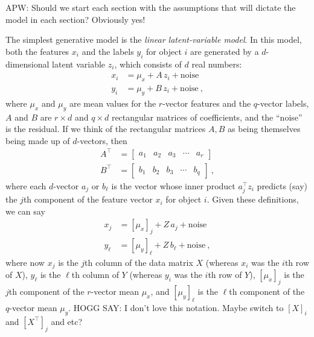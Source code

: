 \documentclass[modern]{aastex631}
\begin{document}
APW: Should we start each section with the assumptions that will dictate the model in each section? Obviously yes!

The simplest generative model is the \emph{linear latent-variable model}.
In this model, both the features $x_i$ and the labels $y_i$ for object $i$ are generated by a $d$-dimensional latent variable $z_i$, which consists of $d$ real numbers:
\begin{align}
  x_i &= \mu_x + A\,z_i + \mbox{noise} \\
  y_i &= \mu_y + B\,z_i + \mbox{noise} ~,
\end{align}
where $\mu_x$ and $\mu_y$ are mean values for the $r$-vector features and the $q$-vector labels,
$A$ and $B$ are $r\times d$ and $q\times d$ rectangular matrices of coefficients,
and the ``noise'' is the residual.
If we think of the rectangular matrices $A, B$ as being themselves being made up of $d$-vectors, then
\begin{align}
  A^\top &= \begin{bmatrix}a_1 & a_2 & a_3 & \cdots & a_r\end{bmatrix} \\
  B^\top &= \begin{bmatrix}b_1 & b_2 & b_3 & \cdots & b_q\end{bmatrix} ~,
\end{align}
where each $d$-vector $a_j$ or $b_\ell$ is the vector whose inner product $a_j^\top z_i$ predicts (say) the $j$th component of the feature vector $x_i$ for object $i$.
Given these definitions, we can say
\begin{align}
  x_j &= [\mu_x]_j + Z\,a_j + \mbox{noise} \\
  y_\ell &= [\mu_y]_\ell + Z\,b_\ell + \mbox{noise} ~,
\end{align}
where now $x_j$ is the $j$th column of the data matrix $X$ (whereas $x_i$ was the $i$th row of $X$),
$y_\ell$ is the $\ell$th column of $Y$ (whereas $y_i$ was the $i$th row of $Y$),
$[\mu_x]_j$ is the $j$th component of the $r$-vector mean $\mu_x$,
and $[\mu_y]_\ell$ is the $\ell$th component of the $q$-vector mean $\mu_y$.
HOGG SAY: I don't love this notation. Maybe switch to $[X]_i$ and $[X^\top]_j$ and etc?
\end{document}
